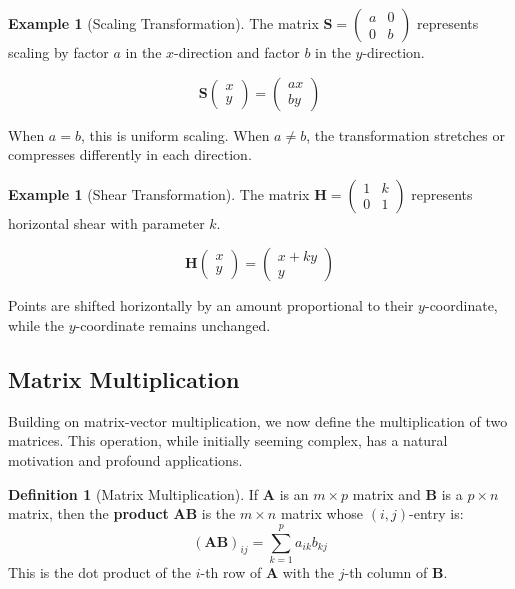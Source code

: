\documentclass[12pt]{article}
\numberwithin{equation}{section}
\newcommand{\mat}[1]{\mathbf{#1}}        %
\theoremstyle{plain}
\theoremstyle{definition}
\newtheorem{definition}[theorem]{Definition}
\newtheorem{example}[theorem]{Example}
\theoremstyle{remark}
\begin{document}
\begin{example}[Scaling Transformation]
The matrix $\mat{S} = \begin{pmatrix} a & 0 \\ 0 & b \end{pmatrix}$ represents scaling by factor $a$ in the $x$-direction and factor $b$ in the $y$-direction.

$$\mat{S}\begin{pmatrix} x \\ y \end{pmatrix} = \begin{pmatrix} ax \\ by \end{pmatrix}$$

When $a = b$, this is uniform scaling. When $a \neq b$, the transformation stretches or compresses differently in each direction.
\end{example}

\begin{example}[Shear Transformation]
The matrix $\mat{H} = \begin{pmatrix} 1 & k \\ 0 & 1 \end{pmatrix}$ represents horizontal shear with parameter $k$.

$$\mat{H}\begin{pmatrix} x \\ y \end{pmatrix} = \begin{pmatrix} x + ky \\ y \end{pmatrix}$$

Points are shifted horizontally by an amount proportional to their $y$-coordinate, while the $y$-coordinate remains unchanged.
\end{example}

\subsection{Matrix Multiplication}

Building on matrix-vector multiplication, we now define the multiplication of two matrices. This operation, while initially seeming complex, has a natural motivation and profound applications.

\begin{definition}[Matrix Multiplication]
If $\mat{A}$ is an $m \times p$ matrix and $\mat{B}$ is a $p \times n$ matrix, then the \textbf{product} $\mat{A}\mat{B}$ is the $m \times n$ matrix whose $(i,j)$-entry is:
$$(\mat{A}\mat{B})_{ij} = \sum_{k=1}^p a_{ik}b_{kj}$$
This is the dot product of the $i$-th row of $\mat{A}$ with the $j$-th column of $\mat{B}$.
\end{definition}
\end{document}
